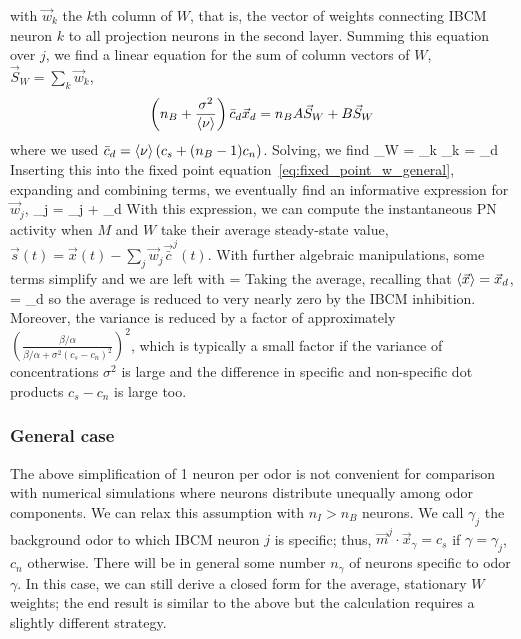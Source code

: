 with $\vec{w}_k$ the $k$th column of $W$, that is, the vector of weights connecting IBCM neuron $k$ to all projection neurons in the second layer. Summing this equation over $j$, we find a linear equation for the sum of column vectors of $W$, $\vec{S}_W = \sum_k \vec{w}_k$, 
\begin{equation*}
\left(n_B + \frac{\sigma^2}{\braket{\nu}} \right) \bar{c}_d  \vec{x}_d = n_B A \vec{S}_W + B \vec{S}_W
\end{equation*}
where we used $\bar{c}_d = \braket{\nu} (c_s + (n_B-1)c_n)$. Solving, we find
\beq
	_W = \sum_k _k =  _d
\eeq
Inserting this into the fixed point equation~\eqref{eq:fixed_point_w_general}, expanding and combining terms, we eventually find an informative expression for $\vec{w}_j$, 
\beq
	_j =  _j +  _d
	\label{eq:steady-state_w_ibcm_1}
\eeq
With this expression, we can compute the instantaneous PN activity when $M$ and $W$ take their average steady-state value, $\vec{s}(t) = \vec{x}(t) - \sum_j \vec{w}_j \vec{\bar{c}}^j(t)$. With further algebraic manipulations, some terms simplify and we are left with
\beq
{} =  
\label{eq:instantaneous_s}
\eeq
Taking the average, recalling that $\braket{\vec{x}} = \vec{x}_d$, 
\beq
{} =   _d
\label{eq:average_s}
\eeq
so the average is reduced to very nearly zero by the IBCM inhibition. Moreover, the variance is reduced by a factor of approximately $\left( \frac{\beta/\alpha}{\beta/\alpha + \sigma^2 (c_s - c_n)^2} \right)^2$, which is typically a small factor if the variance of concentrations $\sigma^2$ is large and the difference in specific and non-specific dot products $c_s - c_n$ is large too. 


\subsubsection{General case}
The above simplification of 1 neuron per odor is not convenient for comparison with numerical simulations where neurons distribute unequally among odor components. We can relax this assumption with $n_I > n_B$ neurons. We call $\gamma_j$ the background odor to which IBCM neuron $j$ is specific; thus, $\vec{m}^j \cdot \vec{x}_{\gamma} = c_s$ if $\gamma = \gamma_j$, $c_n$ otherwise. There will be in general some number $n_{\gamma}$ of neurons specific to odor $\gamma$. In this case, we can still derive a closed form for the average, stationary $W$ weights; the end result is similar to the above but the calculation requires a slightly different strategy. 

